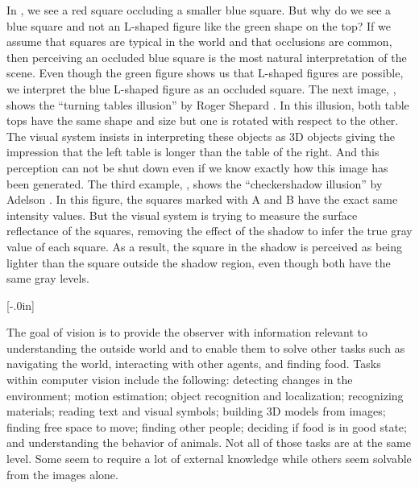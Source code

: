 In , we see a red square occluding a smaller blue square. But why do we see a blue square and not an L-shaped figure like the green shape on the top? If we assume that squares are typical in the world and that occlusions are common, then perceiving an occluded blue square is the most natural interpretation of the scene. Even though the green figure shows us that L-shaped figures are possible, we interpret the blue L-shaped figure as an occluded square. The next image, , shows the ``turning tables illusion'' by Roger Shepard \cite{Shepard90}. In this illusion, both table tops have the same shape and size but one is rotated with respect to the other. The visual system insists in interpreting these objects as 3D objects giving the impression that the left table is longer than the table of the right. 
And this perception can not be shut down even if we know exactly how this image has been generated. The third example, , shows the ``checkershadow illusion'' by Adelson \cite{adelson1995checkershadow}. In this figure, the squares marked with A and B have the exact same intensity values. But the visual system is trying to measure the surface reflectance of the squares, removing the effect of the shadow to infer the true gray value of each square. As a result, the square in the shadow is perceived as being lighter than the square outside the shadow region, even though both have the same gray levels.

[-.0in]


The goal of vision is to provide the observer with information relevant to understanding the outside world and to enable them to solve other tasks such as navigating the world, interacting with other agents, and finding food. Tasks within computer vision include the following: detecting changes in the environment; motion estimation; object recognition and localization; recognizing materials; reading text and visual symbols; building 3D models from images; finding free space to move; finding other people; deciding if food is in good state; and understanding the behavior of animals. Not all of those tasks are at the same level. Some seem to require a lot of external knowledge while others seem solvable from the images alone. 

